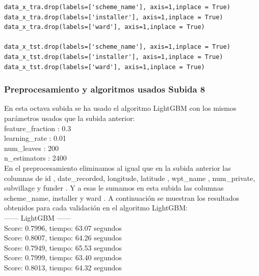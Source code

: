 	\lstset{language=python}
	\begin{lstlisting}[frame=single]
data_x_tra.drop(labels=['scheme_name'], axis=1,inplace = True)
data_x_tra.drop(labels=['installer'], axis=1,inplace = True)
data_x_tra.drop(labels=['ward'], axis=1,inplace = True)

data_x_tst.drop(labels=['scheme_name'], axis=1,inplace = True)
data_x_tst.drop(labels=['installer'], axis=1,inplace = True)
data_x_tst.drop(labels=['ward'], axis=1,inplace = True)
	\end{lstlisting}
	
	
	\subsubsection[Preprocesamiento y algoritmos usados Subida 8]{Preprocesamiento y algoritmos usados Subida 8}
	
	En esta octava subida se ha usado el algoritmo LightGBM con los mismos
	parámetros usados que la subida anterior: \\
	
	feature\_fraction : 0.3 \\
	learning\_rate : 0.01 \\
	num\_leaves : 200 \\
	n\_estimators : 2400 \\
	
	En el preprocesamiento eliminamos al igual que en la subida anterior las columnas de id , date\_recorded,
	longitude, latitude , wpt\_name , num\_private, subvillage y funder . Y a esas le sumamos en esta subida las 
	columnas scheme\_name, installer y ward . A continuación se muestran los resultados 
	obtenidos para cada validación en el algoritmo LightGBM: \\

	------ LightGBM ------\\
	Score: 0.7996, tiempo:  63.07 segundos\\
	Score: 0.8007, tiempo:  64.26 segundos\\
	Score: 0.7949, tiempo:  65.53 segundos\\
	Score: 0.7999, tiempo:  63.40 segundos\\
	Score: 0.8013, tiempo:  64.32 segundos\\
	
